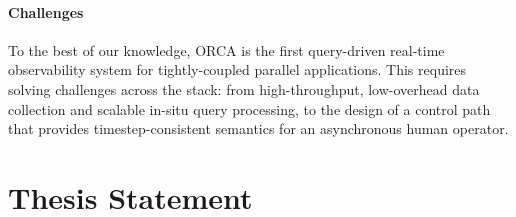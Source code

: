 \paragraph{Challenges}
To the best of our knowledge, ORCA is the first query-driven real-time observability system for
tightly-coupled parallel applications.
This requires solving challenges across the stack: from high-throughput, low-overhead data
collection and scalable in-situ query processing, to the design of a control path that provides
timestep-consistent semantics for an asynchronous human operator.

\section{Thesis Statement}

